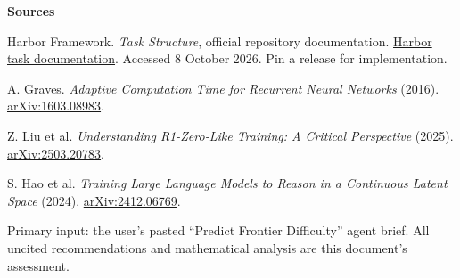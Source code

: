 \documentclass[11pt,a4paper]{article}
\begin{document}
\vspace{3pt}
{\footnotesize
\textbf{Sources}\par
[1] Harbor Framework. \emph{Task Structure}, official repository documentation. \href{https://github.com/harbor-framework/harbor/blob/main/docs/content/docs/tasks/index.mdx}{Harbor task documentation}. Accessed 8 October 2026. Pin a release for implementation.\par
[2] A. Graves. \emph{Adaptive Computation Time for Recurrent Neural Networks} (2016). \href{https://arxiv.org/abs/1603.08983}{arXiv:1603.08983}.\par
[3] Z. Liu et al. \emph{Understanding R1-Zero-Like Training: A Critical Perspective} (2025). \href{https://arxiv.org/abs/2503.20783}{arXiv:2503.20783}.\par
[4] S. Hao et al. \emph{Training Large Language Models to Reason in a Continuous Latent Space} (2024). \href{https://arxiv.org/abs/2412.06769}{arXiv:2412.06769}.\par
Primary input: the user's pasted ``Predict Frontier Difficulty'' agent brief. All uncited recommendations and mathematical analysis are this document's assessment.
}
\end{document}
